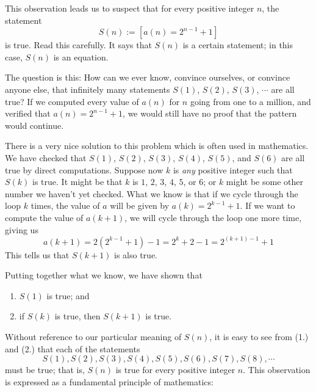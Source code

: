 \documentclass{article}
\newcommand{\0}{\mathbf 0}
\newcommand{\1}{\mathbf 1}
\begin{document}
\begin{description}
    This observation leads us to suspect that for every positive integer $n$, the statement
    \begin{equation*}
    S(n) := [a(n) = 2^{n-1} + 1]
    \end{equation*}
    is true. Read this carefully. It says that $S(n)$ is a certain statement; in this case, $S(n)$ is an equation.

\end{description}

The question is this: How can we ever know, convince ourselves, or convince anyone else, that infinitely many statements $S(1)$, $S(2)$, $S(3)$, $\cdots$ are all true? If we computed every value of $a(n)$ for $n$ going from one to a million, and verified that $a(n) = 2^{n-1} + 1$, we would still have no proof that the pattern would continue.

There is a very nice solution to this problem which is often used in mathematics. We have checked that $S(1)$, $S(2)$, $S(3)$, $S(4)$, $S(5)$, and $S(6)$ are all true by direct computations. Suppose now $k$ is \emph{any} positive integer such that $S(k)$ is true. It might be that $k$ is $1$, $2$, $3$, $4$, $5$, or $6$; or $k$ might be some other number we haven't yet checked. What we know is that if we cycle through the loop $k$ times, the value of $a$ will be given by $a(k) = 2^{k-1} + 1$. If we want to compute the value of $a(k+1)$, we will cycle through the loop one more time, giving us
\begin{equation*}
a(k+1) = 2 (2^{k-1}+1) - 1 = 2^{k} + 2 - 1 = 2^{(k+1)-1} + 1
\end{equation*}
This tells us that $S(k+1)$ is also true.

Putting together what we know, we have shown that
\begin{enumerate}[\hspace{1cm}(1.)]
  \item $S(1)$ is true; and
  \item if $S(k)$ is true, then $S(k+1)$ is true.
\end{enumerate}
Without reference to our particular meaning of $S(n)$, it is easy to see from (1.) and (2.) that each of the statements
\begin{equation*}
S(1), S(2), S(3), S(4), S(5), S(6), S(7), S(8), \cdots
\end{equation*}
must be true; that is, $S(n)$ is true for every positive integer $n$. This observation is expressed as a fundamental principle of mathematics:
\end{document}
